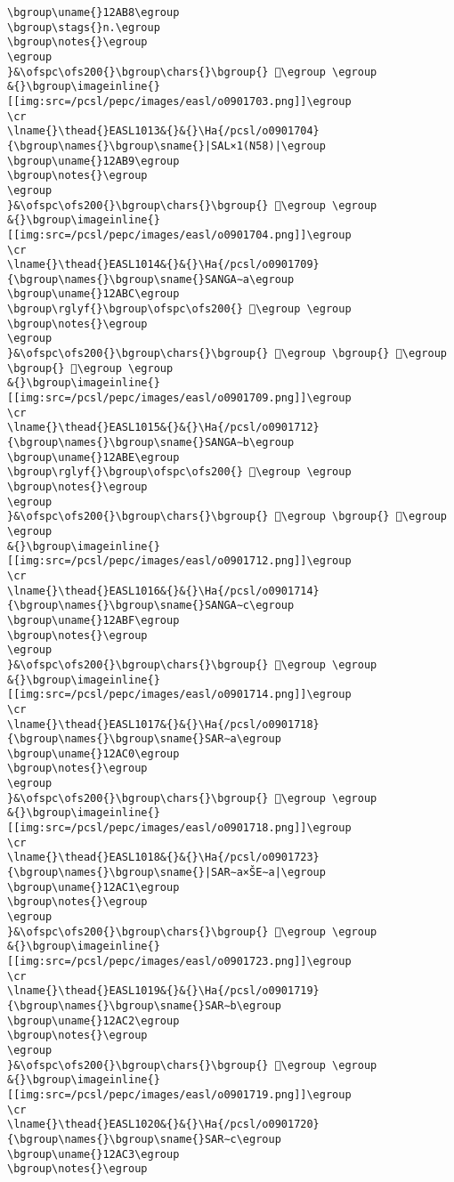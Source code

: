 \begin{verbatim}
\bgroup\uname{}12AB8\egroup
\bgroup\stags{}n.\egroup
\bgroup\notes{}\egroup
\egroup
}&\ofspc\ofs200{}\bgroup\chars{}\bgroup{} 𒪸\egroup \egroup
&{}\bgroup\imageinline{}[[img:src=/pcsl/pepc/images/easl/o0901703.png]]\egroup
\cr
\lname{}\thead{}EASL1013&{}&{}\Ha{/pcsl/o0901704}{\bgroup\names{}\bgroup\sname{}|SAL×1(N58)|\egroup
\bgroup\uname{}12AB9\egroup
\bgroup\notes{}\egroup
\egroup
}&\ofspc\ofs200{}\bgroup\chars{}\bgroup{} 𒪹\egroup \egroup
&{}\bgroup\imageinline{}[[img:src=/pcsl/pepc/images/easl/o0901704.png]]\egroup
\cr
\lname{}\thead{}EASL1014&{}&{}\Ha{/pcsl/o0901709}{\bgroup\names{}\bgroup\sname{}SANGA∼a\egroup
\bgroup\uname{}12ABC\egroup
\bgroup\rglyf{}\bgroup\ofspc\ofs200{} 𒪼\egroup \egroup
\bgroup\notes{}\egroup
\egroup
}&\ofspc\ofs200{}\bgroup\chars{}\bgroup{} 𒪺\egroup \bgroup{} 𒪻\egroup \bgroup{} 𒪼\egroup \egroup
&{}\bgroup\imageinline{}[[img:src=/pcsl/pepc/images/easl/o0901709.png]]\egroup
\cr
\lname{}\thead{}EASL1015&{}&{}\Ha{/pcsl/o0901712}{\bgroup\names{}\bgroup\sname{}SANGA∼b\egroup
\bgroup\uname{}12ABE\egroup
\bgroup\rglyf{}\bgroup\ofspc\ofs200{} 𒪾\egroup \egroup
\bgroup\notes{}\egroup
\egroup
}&\ofspc\ofs200{}\bgroup\chars{}\bgroup{} 𒪽\egroup \bgroup{} 𒪾\egroup \egroup
&{}\bgroup\imageinline{}[[img:src=/pcsl/pepc/images/easl/o0901712.png]]\egroup
\cr
\lname{}\thead{}EASL1016&{}&{}\Ha{/pcsl/o0901714}{\bgroup\names{}\bgroup\sname{}SANGA∼c\egroup
\bgroup\uname{}12ABF\egroup
\bgroup\notes{}\egroup
\egroup
}&\ofspc\ofs200{}\bgroup\chars{}\bgroup{} 𒪿\egroup \egroup
&{}\bgroup\imageinline{}[[img:src=/pcsl/pepc/images/easl/o0901714.png]]\egroup
\cr
\lname{}\thead{}EASL1017&{}&{}\Ha{/pcsl/o0901718}{\bgroup\names{}\bgroup\sname{}SAR∼a\egroup
\bgroup\uname{}12AC0\egroup
\bgroup\notes{}\egroup
\egroup
}&\ofspc\ofs200{}\bgroup\chars{}\bgroup{} 𒫀\egroup \egroup
&{}\bgroup\imageinline{}[[img:src=/pcsl/pepc/images/easl/o0901718.png]]\egroup
\cr
\lname{}\thead{}EASL1018&{}&{}\Ha{/pcsl/o0901723}{\bgroup\names{}\bgroup\sname{}|SAR∼a×ŠE∼a|\egroup
\bgroup\uname{}12AC1\egroup
\bgroup\notes{}\egroup
\egroup
}&\ofspc\ofs200{}\bgroup\chars{}\bgroup{} 𒫁\egroup \egroup
&{}\bgroup\imageinline{}[[img:src=/pcsl/pepc/images/easl/o0901723.png]]\egroup
\cr
\lname{}\thead{}EASL1019&{}&{}\Ha{/pcsl/o0901719}{\bgroup\names{}\bgroup\sname{}SAR∼b\egroup
\bgroup\uname{}12AC2\egroup
\bgroup\notes{}\egroup
\egroup
}&\ofspc\ofs200{}\bgroup\chars{}\bgroup{} 𒫂\egroup \egroup
&{}\bgroup\imageinline{}[[img:src=/pcsl/pepc/images/easl/o0901719.png]]\egroup
\cr
\lname{}\thead{}EASL1020&{}&{}\Ha{/pcsl/o0901720}{\bgroup\names{}\bgroup\sname{}SAR∼c\egroup
\bgroup\uname{}12AC3\egroup
\bgroup\notes{}\egroup

\end{verbatim}
